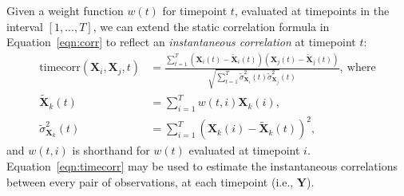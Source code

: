 \documentclass[english]{article}
\begin{document}
Given a weight function $w(t)$ for timepoint $t$, evaluated at
timepoints in the interval $\left[ 1, ..., T \right]$, we can extend the static correlation formula
in Equation~\ref{eqn:corr} to reflect an \textit{instantaneous
  correlation} at timepoint $t$:
\begin{align}
  \mathrm{timecorr}(\mathbf{X}_i, \mathbf{X}_j, t) &= \frac{\sum_{t=1}^T \left(\mathbf{X}_i(t)
                                              -
                                              \widetilde{\mathbf{X}}_i(t)\right) \left(\mathbf{X}_j(t)
                                              -
                                              \widetilde{\mathbf{X}}_j(t)\right)}{\sqrt{\sum_{t=1}^T
                                              \widetilde{\sigma}^2_{\mathbf{X}_i}(t) 
                                              \widetilde{\sigma}^2_{\mathbf{X}_j}}(t)},~\mathrm{where}\\\label{eqn:timecorr}
  \widetilde{\mathbf{X}}_k(t) &= \sum_{i=1}^T
                       w(t, i)\mathbf{X}_k(i),\\
  \widetilde{\sigma}^2_{\mathbf{X}_k}(t) &= \sum_{i=1}^T \left( \mathbf{X}_k(i) -
                            \widetilde{\mathbf{X}}_k(t) \right)^2,
\end{align}
and $w(t, i)$ is shorthand for $w(t)$ evaluated at timepoint $i$.
Equation~\ref{eqn:timecorr} may be used to estimate the instantaneous
correlations between every pair of observations, at each timepoint
(i.e., $\mathbf{Y}$).
\end{document}
